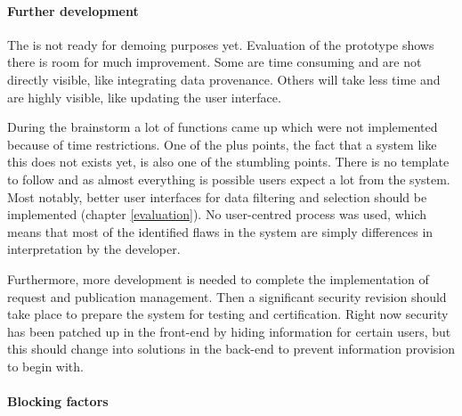 \paragraph{Further development}
The \ivfsystem{} is not ready for demoing purposes yet. 
Evaluation of the prototype shows there is room for much improvement.
Some are time consuming and are not directly visible, like integrating data provenance.
Others will take less time and are highly visible, like updating the user interface.

During the brainstorm a lot of functions came up which were not implemented because of time restrictions.
One of the plus points, the fact that a system like this does not exists yet, is also one of the stumbling points.
There is no template to follow and as almost everything is possible users expect a lot from the system.
Most notably, better user interfaces for data filtering and selection should be implemented (chapter \ref{evaluation}).
No user-centred process was used, which means that most of the identified flaws in the system are simply differences in interpretation by the developer.

Furthermore, more development is needed to complete the implementation of request and publication management.
Then a significant security revision should take place to prepare the system for testing and certification.
Right now security has been patched up in the front-end by hiding information for certain users, but this should change into solutions in the back-end to prevent information provision to begin with.


\paragraph{Blocking factors}



